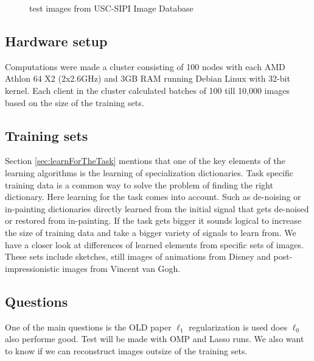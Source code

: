 \begin{figure}[h]
\hspace{5mm}
\caption{test images from USC-SIPI Image Database}
\label{fig:USC-SIPI}
\end{figure}

\subsection{Hardware setup} 
Computations were made a cluster consisting of 100 nodes with each AMD Athlon 64
X2 (2x2.6GHz) and 3GB RAM running Debian Linux with 32-bit kernel. Each client
in the cluster calculated batches of 100 till 10,000 images based on the size of
the training sets.

\subsection{Training sets}
Section \ref{sec:learnForTheTask} mentions that one of the key
elements of the learning algorithms is the learning of specialization
dictionaries. Task specific training data is a common way to solve the problem
of finding  the right dictionary. Here learning for the task comes into
account. Such as de-noising or in-painting dictionaries directly learned from
the initial signal that gets de-noised or restored from in-painting. If the task
gets bigger it sounds logical to increase the size of training data and take a
bigger variety of signals to learn from.  We have a closer look at differences
of learned elements from specific sets of images. These sets include sketches,
still images of animations from Disney and post-impressionistic images from
Vincent van Gogh.  

\subsection{Questions}
One of the main questions is the OLD paper $\ell_1$ regularization is used does
$\ell_0$ also performe good.
Test will be made with OMP and Lasso runs.
We also want to know if we can reconstruct images outsize of the
training sets.



